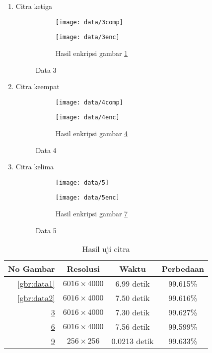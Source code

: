 \begin{enumerate}[label=(\alph*)]
	\item Citra ketiga
	\begin{figure}\centering
		\begin{subfigure}{\textwidth}
		\texttt{[image: data/3comp]}
		\caption{}
		\label{gbr:plain3}
	\end{subfigure}
	\begin{subfigure}{\textwidth}
		\texttt{[image: data/3enc]}
		\caption{Hasil enkripsi gambar \ref{gbr:plain3}}
		\label{gbr:enc3}
	\end{subfigure}
	\caption{Data 3}
	\label{gbr:data3}
	\end{figure}
	
	\item Citra keempat
	\begin{figure}\centering
	\begin{subfigure}{\textwidth}
		\texttt{[image: data/4comp]}
		\caption{}
		\label{gbr:plain4}
	\end{subfigure}
	\begin{subfigure}{\textwidth}
		\texttt{[image: data/4enc]}
		\caption{Hasil enkripsi gambar \ref{gbr:plain4}}
		\label{gbr:enc4}
	\end{subfigure}
	\caption{Data 4}
	\label{gbr:data4}
	\end{figure}
	
	\item Citra kelima
	\begin{figure}\centering
		\begin{subfigure}{\textwidth}
			\texttt{[image: data/5]}
			\caption{}
			\label{gbr:plain5}
		\end{subfigure}
		\begin{subfigure}{\textwidth}
			\texttt{[image: data/5enc]}
			\caption{Hasil enkripsi gambar \ref{gbr:plain5}}
			\label{gbr:enc5}
		\end{subfigure}
		\caption{Data 5}
		\label{gbr:data5}
	\end{figure}
\end{enumerate}

\begin{table} \centering
\caption{Hasil uji citra}
	\begin{tabular}{|r|c|c|c||} \hline
	\textbf{No Gambar} &{\bf Resolusi}    &\textbf{Waktu\footnotemark[2]}&\textbf{Perbedaan}\\ \hline
	\ref{gbr:data1}    &$6016\times 4000$ &6.99 detik    &99.615\%          \\ \hline
	\ref{gbr:data2}    &$6016\times 4000$ &7.50 detik    &99.616\%          \\ \hline
	\ref{gbr:data3}    &$6016\times 4000$ &7.30 detik    &99.627\%          \\ \hline
	\ref{gbr:data4}    &$6016\times 4000$ &7.56 detik    &99.599\%          \\ \hline
	\ref{gbr:data5}    &$256\times 256$   &0.0213 detik  &99.633\%          \\ \hline
	\end{tabular}
\end{table}

